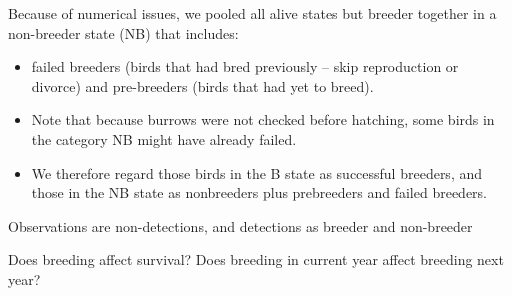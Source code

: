 \documentclass[
  12pt,
]{krantz}
\begin{document}
Because of numerical issues, we pooled all alive states but breeder together in a non-breeder state (NB) that includes:

\begin{itemize}
\item
  failed breeders (birds that had bred previously -- skip reproduction or divorce) and pre-breeders (birds that had yet to breed).
\item
  Note that because burrows were not checked before hatching, some birds in the category NB might have already failed.
\item
  We therefore regard those birds in the B state as successful breeders, and those in the NB state as nonbreeders plus prebreeders and failed breeders.
\end{itemize}

Observations are non-detections, and detections as breeder and non-breeder

Does breeding affect survival? Does breeding in current year affect breeding next year?
\end{document}
